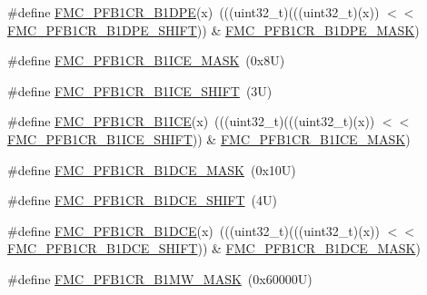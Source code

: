 \begin{DoxyCompactItemize}
\item 
\#define \mbox{\hyperlink{group___f_m_c___register___masks_ga914e569e482b82ed71fb64527e1fee3d}{F\+M\+C\+\_\+\+P\+F\+B1\+C\+R\+\_\+\+B1\+D\+PE}}(x)~(((uint32\+\_\+t)(((uint32\+\_\+t)(x)) $<$$<$ \mbox{\hyperlink{group___f_m_c___register___masks_ga9a6d2f7bfce24b100a34731744602db7}{F\+M\+C\+\_\+\+P\+F\+B1\+C\+R\+\_\+\+B1\+D\+P\+E\+\_\+\+S\+H\+I\+FT}})) \& \mbox{\hyperlink{group___f_m_c___register___masks_gad8ceabcc8b8c9f94ac2216c3bf87f3af}{F\+M\+C\+\_\+\+P\+F\+B1\+C\+R\+\_\+\+B1\+D\+P\+E\+\_\+\+M\+A\+SK}})
\item 
\#define \mbox{\hyperlink{group___f_m_c___register___masks_ga54e7a000de93d88f2b6287e197890347}{F\+M\+C\+\_\+\+P\+F\+B1\+C\+R\+\_\+\+B1\+I\+C\+E\+\_\+\+M\+A\+SK}}~(0x8\+U)
\item 
\#define \mbox{\hyperlink{group___f_m_c___register___masks_gab0d831cd340d45b11c048d8a51bb9e15}{F\+M\+C\+\_\+\+P\+F\+B1\+C\+R\+\_\+\+B1\+I\+C\+E\+\_\+\+S\+H\+I\+FT}}~(3\+U)
\item 
\#define \mbox{\hyperlink{group___f_m_c___register___masks_gab4bbc910ce20842605a3ffd0760fdda6}{F\+M\+C\+\_\+\+P\+F\+B1\+C\+R\+\_\+\+B1\+I\+CE}}(x)~(((uint32\+\_\+t)(((uint32\+\_\+t)(x)) $<$$<$ \mbox{\hyperlink{group___f_m_c___register___masks_gab0d831cd340d45b11c048d8a51bb9e15}{F\+M\+C\+\_\+\+P\+F\+B1\+C\+R\+\_\+\+B1\+I\+C\+E\+\_\+\+S\+H\+I\+FT}})) \& \mbox{\hyperlink{group___f_m_c___register___masks_ga54e7a000de93d88f2b6287e197890347}{F\+M\+C\+\_\+\+P\+F\+B1\+C\+R\+\_\+\+B1\+I\+C\+E\+\_\+\+M\+A\+SK}})
\item 
\#define \mbox{\hyperlink{group___f_m_c___register___masks_gaa101cb7bed362dfe0e710d0215b4b150}{F\+M\+C\+\_\+\+P\+F\+B1\+C\+R\+\_\+\+B1\+D\+C\+E\+\_\+\+M\+A\+SK}}~(0x10\+U)
\item 
\#define \mbox{\hyperlink{group___f_m_c___register___masks_ga47fc3edc8a93d72c87293c77167eb953}{F\+M\+C\+\_\+\+P\+F\+B1\+C\+R\+\_\+\+B1\+D\+C\+E\+\_\+\+S\+H\+I\+FT}}~(4\+U)
\item 
\#define \mbox{\hyperlink{group___f_m_c___register___masks_ga7ec9057e4aa626be90691effa78513c8}{F\+M\+C\+\_\+\+P\+F\+B1\+C\+R\+\_\+\+B1\+D\+CE}}(x)~(((uint32\+\_\+t)(((uint32\+\_\+t)(x)) $<$$<$ \mbox{\hyperlink{group___f_m_c___register___masks_ga47fc3edc8a93d72c87293c77167eb953}{F\+M\+C\+\_\+\+P\+F\+B1\+C\+R\+\_\+\+B1\+D\+C\+E\+\_\+\+S\+H\+I\+FT}})) \& \mbox{\hyperlink{group___f_m_c___register___masks_gaa101cb7bed362dfe0e710d0215b4b150}{F\+M\+C\+\_\+\+P\+F\+B1\+C\+R\+\_\+\+B1\+D\+C\+E\+\_\+\+M\+A\+SK}})
\item 
\#define \mbox{\hyperlink{group___f_m_c___register___masks_ga06524893e4c90b6159ef3dbd4ad4c876}{F\+M\+C\+\_\+\+P\+F\+B1\+C\+R\+\_\+\+B1\+M\+W\+\_\+\+M\+A\+SK}}~(0x60000\+U)
$$
\end{DoxyCompactItemize}
